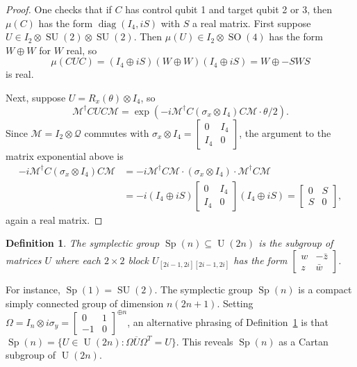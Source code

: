 \documentclass[reqno]{amsart}
\newtheorem{definition}[theorem]{Definition}
\theoremstyle{definition} \newtheorem{example}[theorem]{Example}
\newcommand{\U}{\operatorname{U}}
\newcommand{\SU}{\operatorname{SU}}
\newcommand{\SO}{\operatorname{SO}}
\newcommand{\Sp}{\operatorname{Sp}}
\newcommand{\diag}{\operatorname{diag}}
\newcommand{\M}{\mathcal{M}}
\newcommand{\Q}{\mathcal{Q}}
\begin{document}
\begin{proof}
One checks that if $C$ has control qubit 1 and target qubit 2 or 3, then $\mu(C)$ has the form $\diag(I_4, iS)$ with $S$ a real matrix. First suppose $U \in I_2 \otimes \SU(2) \otimes \SU(2)$. Then $\mu(U) \in I_2 \otimes \SO(4)$ has the form $W \oplus W$ for $W$ real, so
\begin{equation*}
\mu(CUC) = (I_4 \oplus iS)(W \oplus W)(I_4 \oplus iS) = W \oplus -SWS 
\end{equation*}
is real.

Next, suppose $U = R_x(\theta) \otimes I_4$, so
\begin{equation*}
\M^\dagger C U C \M = \exp(-i\M^\dagger C (\sigma_x \otimes I_4) C \M \cdot \theta/2).
\end{equation*}
Since $\M = I_2 \otimes \Q$ commutes with $\sigma_x \otimes I_4 = \left[ \begin{smallmatrix} 0 & I_4 \\ I_4 & 0 \end{smallmatrix} \right]$, the argument to the matrix exponential above is
\begin{align*}
-i\M^\dagger C(\sigma_x \otimes I_4) C \M &= -i\M^\dagger C\M\cdot (\sigma_x \otimes I_4)\cdot \M^\dagger C \M\\
&= -i(I_4 \oplus iS) \begin{bmatrix} 0 & I_4 \\ I_4 & 0 \end{bmatrix} (I_4 \oplus iS) = \begin{bmatrix} 0 & S \\ S & 0 \end{bmatrix},
\end{align*}
again a real matrix.
\end{proof}

\begin{definition} \label{def:sp}
The \emph{symplectic group} $\Sp(n) \subseteq \U(2n)$ is the subgroup of matrices $U$ where each $2 \times 2$ block $U_{[2i-1,2i][2i-1,2i]}$ has the form $\left[ \begin{smallmatrix} w & -\bar{z} \\ z & \bar{w} \end{smallmatrix} \right]$.
\end{definition}
For instance, $\Sp(1) = \SU(2)$. The symplectic group $\Sp(n)$ is a compact simply connected group of dimension $n(2n+1)$. Setting $\Omega = I_n \otimes i\sigma_y = \left[ \begin{smallmatrix} 0 & 1 \\ -1 & 0 \end{smallmatrix} \right]^{\oplus n}$, an alternative phrasing of Definition~\ref{def:sp} is that $\Sp(n) = \{U \in \U(2n) : \Omega \overline{U} \Omega^T = U\}$. This reveals $\Sp(n)$ as a Cartan subgroup of $\U(2n)$. 
\end{document}
